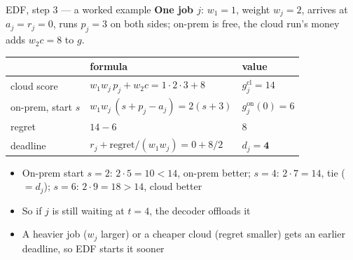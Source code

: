 \documentclass[aspectratio=169,t]{beamer}
\begin{document}
\begin{frame}{EDF, step 3 --- a worked example}
  \textbf{One job $j$}: $w_1 = 1$, weight $w_j = 2$, arrives at $a_j = r_j = 0$,
  runs $p_j = 3$ on both sides; on-prem is free, the cloud run's money
  adds $w_2 c = 8$ to $g$.
  \begin{center}
  \footnotesize
  \begin{tabular}{@{}lll@{}}
    \toprule
    & formula & value \\
    \midrule
    cloud score         & $w_1 w_j\,p_j + w_2 c = 1\cdot2\cdot3 + 8$ & $g^{\text{cl}}_j = 14$ \\
    on-prem, start $s$  & $w_1 w_j\,(s + p_j - a_j) = 2(s + 3)$        & $g^{\text{on}}_j(0) = 6$ \\
    regret              & $14 - 6$                                     & $8$ \\
    deadline            & $r_j + \text{regret}/(w_1 w_j) = 0 + 8/2$    & $d_j = \mathbf{4}$ \\
    \bottomrule
  \end{tabular}
  \end{center}
  \begin{itemize}
    \item On-prem start $s=2$: $2\cdot5 = 10 < 14$, on-prem better;
      \; $s=4$: $2\cdot7 = 14$, tie ($=d_j$);
      \; $s=6$: $2\cdot9 = 18 > 14$, cloud better
    \item So if $j$ is still waiting at $t = 4$, the decoder offloads it
    \item A heavier job ($w_j$ larger) or a cheaper cloud (regret smaller)
      gets an \alert{earlier} deadline, so EDF starts it sooner
  \end{itemize}
\end{frame}
\end{document}
